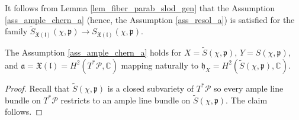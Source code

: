 \documentclass[12pt]{amsart}
\begin{document}
It follows from Lemma \ref{lem_fiber_parab_slod_gen} that the Assumption \ref{ass_ample_chern_a} (hence, the Assumption \ref{ass_resol_a}) is satisfied for the family $\widetilde{S}_{\mathfrak{X}(\mathfrak{l})}(\chi,\mathfrak{p}) \rightarrow S_{\mathfrak{X}(\mathfrak{l})}(\chi,\mathfrak{p})$. 

\begin{lemma}
The Assumption \ref{ass_ample_chern_a} holds for $X=\widetilde{S}(\chi,\mathfrak{p})$, $Y=S(\chi,\mathfrak{p})$, and $\mathfrak{a}=\mathfrak{X}(\mathfrak{l})=H^2(T^*\mathcal{P},\mathbb{C})$ mapping naturally to $\mathfrak{h}_X=H^2(\widetilde{S}(\chi,\mathfrak{p}),\mathbb{C})$. 
\end{lemma}
\begin{proof}
Recall that $\widetilde{S}(\chi,\mathfrak{p})$ is a closed subvariety of $T^*\mathcal{P}$ so every ample line bundle on $T^*\mathcal{P}$ restricts to an ample line bundle on $\widetilde{S}(\chi,\mathfrak{p})$. The claim follows. 
\end{proof}



\end{document}
